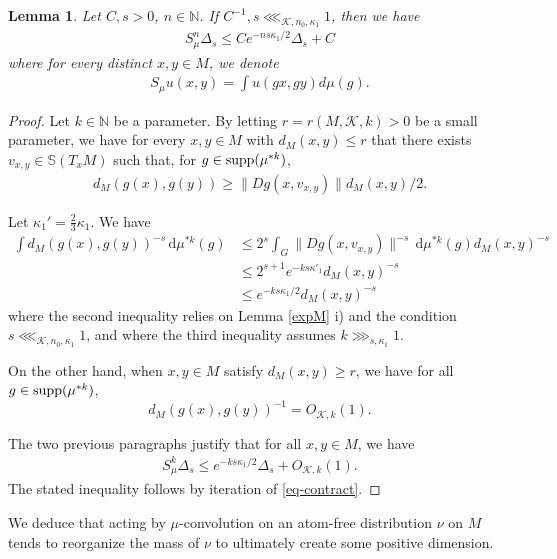 \documentclass[11pt, leqno, fleqn]{amsart}
\def \N{{\mathbb N}}
\newcommand{\dd}{\,\mathrm{d}}
\newcommand{\cK}{{\mathcal K}}
\newcommand{\ary}{\begin{eqnarray}}
\newcommand{\eary}{\end{eqnarray}}
\newcommand{\aryst}{\begin{eqnarray*}}
\newcommand{\earyst}{\end{eqnarray*}}
\newtheorem{lemma}[thm]{\bf Lemma}
\theoremstyle{definition}
\theoremstyle{definition}
\def\supp{{\rm supp}}
\def\S{ {\mathbb{S}} }
\def \vol{  {\rm vol} }
\begin{document}

\begin{lemma} \label{lem margulisineq}
	Let $C,s>0$, $n \in \N$. If  $C^{-1},s\lll_{\cK,n_{0}, \kappa_{1}}1$,  then  we have
	\aryst
	S_{\mu}^{n} \Delta_s \leq C e^{- ns\kappa_{1}/2  }\Delta_s + C
	\earyst
	where for every distinct $x, y \in M$, we denote
	\aryst
	S_{\mu}u(x, y) = \int  u(gx, gy) d\mu(g).
	\earyst
\end{lemma}


\begin{proof}
	Let $k\in \N$ be a parameter. By letting $r  = r(M, \cK, k) > 0$ be a small parameter, we have for  every $x, y \in M$ with $d_M(x, y) \leq r$ that there exists $v_{x,y}\in \S(T_{x}M)$  such that, for $g\in \supp( \mu^{*k})$, 
	\aryst
	d_M(g(x), g(y)) \geq \|  Dg(x, v_{x,y}) \| d_M(x, y)/2.
	\earyst
	
	Let $\kappa_{1}'=\frac{2}{3}\kappa_{1}$.  We have
	\begin{align*}
	\int  d_{M}(g(x), g(y) )^{-s} \dd\mu^{*k}(g) 
	&\leq 2^s\int_{G} \| Dg(x, v_{x,y}) \|^{-s} \dd\mu^{*k}(g) d_M(x, y)^{-s}\\
	&\leq 2^{s+1} e^{-k s \kappa'_{1}} d_M(x, y)^{-s}\\
	&\leq e^{-k s \kappa_{1}/2} d_M(x, y)^{-s}
	\end{align*}
	where the second inequality relies on Lemma \ref{expM} i) and the condition $s\lll_{\cK,n_{0}, \kappa_{1}}1$, and where the third inequality assumes $k\ggg_{s,\kappa_{1}}1$.
	
	On the other hand, when $x,y\in M$ satisfy $d_M(x, y) \geq r$, we have  for all $g\in \supp (\mu^{*k})$, 
	$$d_{M}(g(x), g(y))^{-1}=O_{\cK, k}(1).$$
	
The two previous paragraphs justify that for all $x,y\in M$, we have
		\ary\label{eq-contract}
		S_{\mu}^{k} \Delta_s \leq  e^{- k s \kappa_{1}/2 }\Delta_s + O_{\cK, k}(1).
		\eary
The stated inequality follows by iteration of \eqref{eq-contract}.
\end{proof}




We deduce that acting by $\mu$-convolution on an atom-free distribution $\nu$ on  $M$ tends to reorganize the mass of $\nu$ to ultimately create some positive dimension. 
\end{document}
